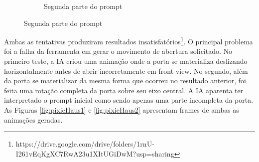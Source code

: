 \begin{figure}[htbp]
\begin{subfigure}{0.45\linewidth}
        \caption{\small Segunda parte do prompt}
        \label{fig:pixieHausPrompt2b}
    \end{subfigure}
\end{figure}

Ambas as tentativas produziram resultados insatisfatórios\footnote{https://drive.google.com/drive/folders/1rnU-I261vEqKgXC7RwA23u1XItUGiDwM?usp=sharing}. O principal problema foi a falha da ferramenta em gerar o movimento de abertura solicitado. No primeiro teste, a IA criou uma animação onde a porta se materializa deslizando horizontalmente antes de abrir incorretamente em front view. No segundo, além da porta se materializar da mesma forma que ocorreu no resultado anterior, foi feita uma rotação completa da porta sobre seu eixo central. A IA aparenta ter interpretado o prompt inicial como sendo apenas uma parte incompleta da porta. As Figuras \ref{fig:pixieHaus1} e \ref{fig:pixieHaus2} apresentam frames de ambas as animações geradas.

